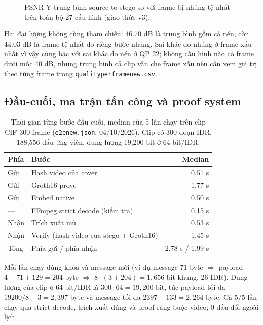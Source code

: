 \documentclass[11pt,a4paper]{article}
\renewcommand{\_}{\origunderscore\allowbreak}
\begin{document}
\begin{figure}[H]\centering
{}
\caption{PSNR-Y trung bình source-to-stego so với frame bị nhúng tệ nhất trên toàn bộ 27 cấu hình (giao thức v3).}
\label{fig:quality-gap}
\end{figure}
Hai đại lượng không cùng tham chiếu: 46.70 dB là trung bình gồm cả nén, còn 44.03 dB là frame tệ nhất do riêng bước nhúng. Sai khác do nhúng ở frame xấu nhất vì vậy cùng bậc với sai khác do nén ở QP 22; không cấu hình nào có frame dưới mốc 40 dB, nhưng trung bình cả clip vẫn che frame xấu nên cần xem giá trị theo từng frame trong \texttt{quality\_per\_frame\_new.csv}.

\subsection{Đầu-cuối, ma trận tấn công và proof system}
\begin{table}[H]\centering\small
\caption{Thời gian từng bước đầu-cuối, median của 5 lần chạy trên clip CIF 300 frame (\texttt{e2e\_new.json}, 04/10/2026). Clip có 300 đoạn IDR, 188,556 dấu ứng viên, dung lượng 19,200 bit ở 64 bit/IDR.}
\begin{tabular}{llr}\toprule
Phía & Bước & Median\\\midrule
Gửi & Hash video của cover & 0.51 s\\
Gửi & Groth16 prove & 1.77 s\\
Gửi & Embed native & 0.50 s\\
--- & FFmpeg strict decode (kiểm tra) & 0.15 s\\
Nhận & Trích xuất mù & 0.53 s\\
Nhận & Verify (hash video của stego + Groth16) & 1.45 s\\\midrule
Tổng & Phía gửi / phía nhận & 2.78 s / 1.99 s\\
\bottomrule\end{tabular}
\end{table}
Mỗi lần chạy dùng khóa và message mới (ví dụ message 71 byte $\Rightarrow$ payload $4+71+129=204$ byte $\Rightarrow$ $8\cdot(3+204)=1{,}656$ bit khung, 26 IDR). Dung lượng của clip ở 64 bit/IDR là $300\cdot64=19{,}200$ bit, tức payload tối đa $19200/8-3=2{,}397$ byte và message tối đa $2397-133=2{,}264$ byte. Cả 5/5 lần chạy qua strict decode, trích xuất đúng và proof ràng buộc video; 0 dấu đổi ngoài lịch.
\end{document}
